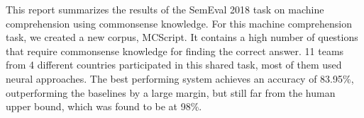 This report summarizes the results of the SemEval 2018 task on machine comprehension using commonsense knowledge. For this machine comprehension task, we created a new corpus, MCScript. It contains a high number of questions that require commonsense knowledge for finding the correct answer. 11 teams from 4 different countries participated in this shared task, most of them used neural approaches. The best performing system achieves an accuracy of 83.95\%, outperforming the baselines by a large margin, but still far from the human upper bound, which was found to be at 98\%.
